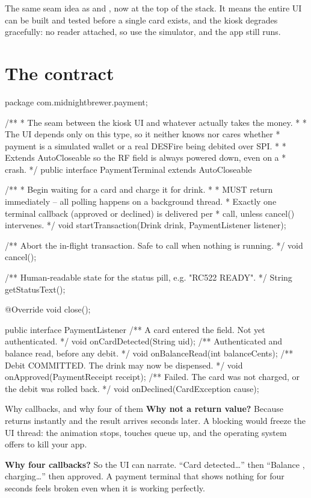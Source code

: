 The same seam idea as  and , now at the top of
the stack. It means the entire UI can be built and tested before a single card
exists, and the kiosk degrades gracefully: no reader attached, so use the
simulator, and the app still runs.

\section{The contract}

\begin{jcode}
package com.midnightbrewer.payment;

/**
 * The seam between the kiosk UI and whatever actually takes the money.
 *
 * The UI depends only on this type, so it neither knows nor cares whether
 * payment is a simulated wallet or a real DESFire being debited over SPI.
 *
 * Extends AutoCloseable so the RF field is always powered down, even on a
 * crash.
 */
public interface PaymentTerminal extends AutoCloseable {

    /**
     * Begin waiting for a card and charge it for drink.
     *
     * MUST return immediately -- all polling happens on a background thread.
     * Exactly one terminal callback (approved or declined) is delivered per
     * call, unless cancel() intervenes.
     */
    void startTransaction(Drink drink, PaymentListener listener);

    /** Abort the in-flight transaction. Safe to call when nothing is running. */
    void cancel();

    /** Human-readable state for the status pill, e.g. "RC522 READY". */
    String getStatusText();

    @Override
    void close();
}
\end{jcode}

\begin{jcode}
public interface PaymentListener {
    /** A card entered the field. Not yet authenticated. */
    void onCardDetected(String uid);
    /** Authenticated and balance read, before any debit. */
    void onBalanceRead(int balanceCents);
    /** Debit COMMITTED. The drink may now be dispensed. */
    void onApproved(PaymentReceipt receipt);
    /** Failed. The card was not charged, or the debit was rolled back. */
    void onDeclined(CardException cause);
}
\end{jcode}

\begin{concept}{Why callbacks, and why four of them}
\textbf{Why not a return value?} Because  returns
instantly and the result arrives seconds later. A blocking  would freeze the UI thread: the animation stops, touches queue up,
and the operating system offers to kill your app.

\textbf{Why four callbacks?} So the UI can narrate. ``Card detected\ldots'' then
``Balance , charging\ldots'' then approved. A payment terminal that
shows nothing for four seconds feels broken even when it is working perfectly.
\end{concept}


